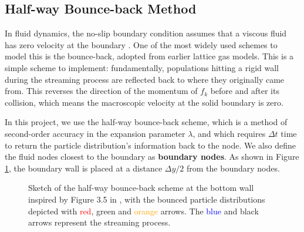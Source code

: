 \documentclass[a4paper, 11pt]{report}
\begin{document}
\subsection{Half-way Bounce-back Method}
In fluid dynamics, the no-slip boundary condition assumes that a viscous fluid has zero velocity at the boundary \cite[Section 6.4]{fmnotes}. One of the most widely used schemes to model this is the bounce-back, adopted from earlier lattice gas models. This is a simple scheme to implement: fundamentally, populations hitting a rigid wall during the streaming process are reflected back to where they originally came from. This reverses the direction of the momentum of $f_k$ before and after its collision, which means the macroscopic velocity at the solid boundary is zero.


In this project, we use the half-way bounce-back scheme, which is a method of second-order accuracy in the expansion parameter $\lambda$, and which requires $\Delta t$ time to return the particle distribution's information back to the node. We also define the fluid nodes closest to the boundary as \textbf{boundary nodes}. As shown in Figure \ref{fig:hwbb}, the boundary wall is placed at a distance $\Delta y/2$ from the boundary nodes.

\begin{figure}[!htb]
    \centering
    
\caption[Sketch of the half-way bounce-back scheme at the bottom wall]{Sketch of the half-way bounce-back scheme at the bottom wall inspired by Figure 3.5 in \cite{mp}, with the bounced particle distributions depicted with \textcolor{red}{red}, \textcolor{green01270}{green} and \textcolor{orange}{orange} arrows. The \textcolor{blue}{blue} and black arrows represent the streaming process.} \label{fig:hwbb}
\end{figure}
\end{document}
